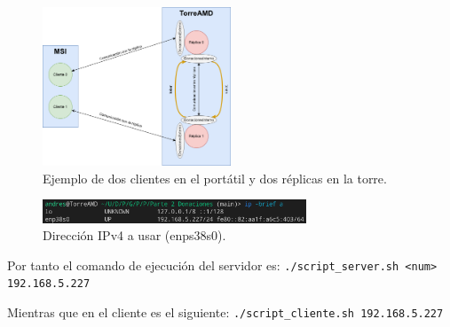 \documentclass{article}
\begin{document}
\begin{figure}[H]
    \centering
    \includegraphics[width=0.5\textwidth]{imagenes/variosOrdenadores.png}
    \caption{Ejemplo de dos clientes en el portátil y dos réplicas en la torre.}
\end{figure}

\begin{figure}[H]
    \centering
    \includegraphics[width=0.7\textwidth]{imagenes/multiples ordenadores/IP.png}
    \caption{Dirección IPv4 a usar (enps38s0).}
\end{figure}

\bigskip

Por tanto el comando de ejecución del servidor es: \verb|./script_server.sh <num> 192.168.5.227|

Mientras que en el cliente es el siguiente: \verb|./script_cliente.sh 192.168.5.227|
\end{document}
